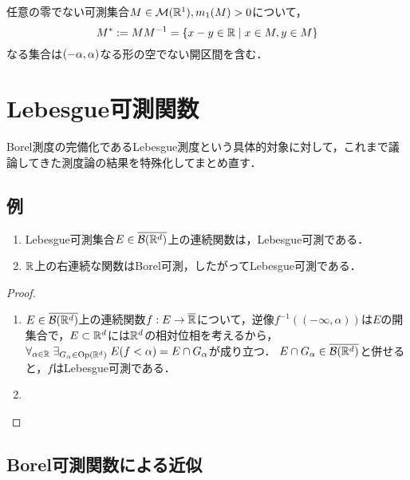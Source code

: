 \documentclass[uplatex, dvipdfmx]{jsreport}
\begin{document}
\begin{theorem}
    任意の零でない可測集合$M\in\mathcal{M}(\mathbb{R}^1),m_1(M)>0$について，
    \[M^*:=MM^{-1}=\left\{x-y\in\mathbb{R}\mid x\in M,y\in M\right\}\]
    なる集合は$(-\alpha,\alpha)$なる形の空でない開区間を含む．
\end{theorem}

\section{Lebesgue可測関数}

\begin{tcolorbox}[colframe=ForestGreen, colback=ForestGreen!10!white,breakable,colbacktitle=ForestGreen!40!white,coltitle=black,fonttitle=\bfseries\sffamily,
title=]
    Borel測度の完備化であるLebesgue測度という具体的対象に対して，これまで議論してきた測度論の結果を特殊化してまとめ直す．
\end{tcolorbox}

\subsection{例}

\begin{proposition}[Lebesgue可測関数と位相]\label{prop-continuous-function-is-Lebesgue-measurable}\mbox{}
    \begin{enumerate}
        \item Lebesgue可測集合$E\in\overline{\mathcal{B}(\mathbb{R}^d)}$上の連続関数は，Lebesgue可測である．
        \item $\mathbb{R}$上の右連続な関数はBorel可測，したがってLebesgue可測である．
    \end{enumerate}
\end{proposition}
\begin{proof}\mbox{}
    \begin{enumerate}
        \item $E\in\overline{\mathcal{B}(\mathbb{R}^d)}$上の連続関数$f:E\to\overline{\mathbb{R}}$について，逆像$f^{-1}((-\infty,\alpha))$は$E$の開集合で，$E\subset\mathbb{R}^d$には$\mathbb{R}^d$の相対位相を考えるから，
        $\forall_{\alpha\in\mathbb{R}}\;\exists_{G_\alpha\in\mathrm{Op}(\mathbb{R}^d)}\;E(f<\alpha)=E\cap G_\alpha$が成り立つ．
        $E\cap G_\alpha\in\overline{\mathcal{B}(\mathbb{R}^d)}$と併せると，$f$はLebesgue可測である．
        \item 

    \end{enumerate}
\end{proof}

\subsection{Borel可測関数による近似}
\end{document}
